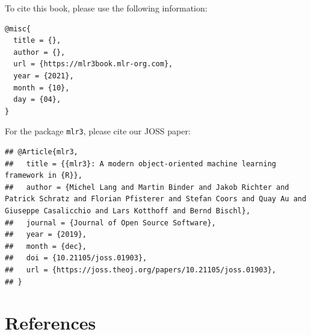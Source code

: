 \documentclass[
]{scrbook}
\begin{document}
To cite this book, please use the following information:

\begin{verbatim}
@misc{
  title = {},
  author = {},
  url = {https://mlr3book.mlr-org.com},
  year = {2021},
  month = {10},
  day = {04},
}
\end{verbatim}

For the package \texttt{mlr3}, please cite our JOSS paper:

\begin{verbatim}
## @Article{mlr3,
##   title = {{mlr3}: A modern object-oriented machine learning framework in {R}},
##   author = {Michel Lang and Martin Binder and Jakob Richter and Patrick Schratz and Florian Pfisterer and Stefan Coors and Quay Au and Giuseppe Casalicchio and Lars Kotthoff and Bernd Bischl},
##   journal = {Journal of Open Source Software},
##   year = {2019},
##   month = {dec},
##   doi = {10.21105/joss.01903},
##   url = {https://joss.theoj.org/papers/10.21105/joss.01903},
## }
\end{verbatim}

\hypertarget{references}{%
\chapter*{References}\label{references}}
\end{document}
